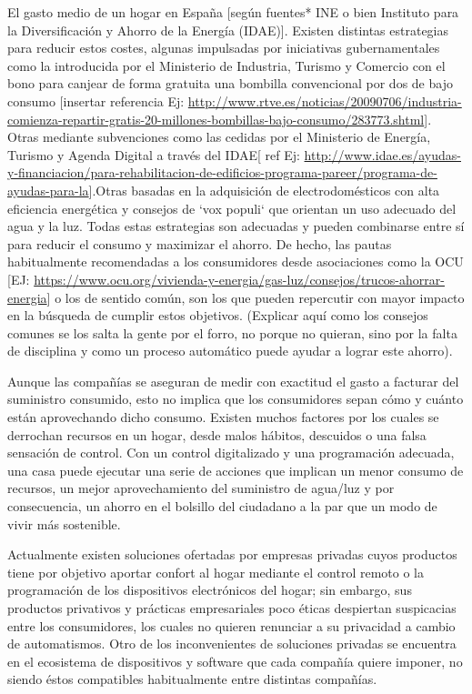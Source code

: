 El gasto medio de un hogar en España [según fuentes* INE o bien Instituto para la Diversificación y Ahorro de la Energía (IDAE)]. Existen distintas estrategias para reducir estos costes, algunas impulsadas por iniciativas gubernamentales como la introducida por el Ministerio de Industria, Turismo y Comercio con el bono para canjear de forma gratuita una bombilla convencional por dos de bajo consumo [insertar referencia Ej: \url{http://www.rtve.es/noticias/20090706/industria-comienza-repartir-gratis-20-millones-bombillas-bajo-consumo/283773.shtml}]. Otras mediante subvenciones como las cedidas por el Ministerio de Energía, Turismo y Agenda Digital a través del IDAE[ ref Ej: \url{http://www.idae.es/ayudas-y-financiacion/para-rehabilitacion-de-edificios-programa-pareer/programa-de-ayudas-para-la}].Otras basadas en la adquisición de electrodomésticos con alta eficiencia energética y consejos de `vox populi` que orientan un uso adecuado del agua y la luz. Todas estas estrategias son adecuadas y pueden combinarse entre sí para reducir el consumo y maximizar el ahorro. De hecho, las pautas habitualmente recomendadas a los consumidores desde asociaciones como la OCU [EJ: \url{https://www.ocu.org/vivienda-y-energia/gas-luz/consejos/trucos-ahorrar-energia}] o los de sentido común, son los que pueden repercutir con mayor impacto en la búsqueda de cumplir estos objetivos. (Explicar aquí como los consejos comunes se los salta la gente por el forro, no porque no quieran, sino por la falta de disciplina y como un proceso automático puede ayudar a lograr este ahorro).

Aunque las compañías se aseguran de medir con exactitud el gasto a facturar del suministro consumido, esto no implica que los consumidores sepan cómo y cuánto están aprovechando dicho consumo. Existen muchos factores por los cuales se derrochan recursos en un hogar, desde malos hábitos, descuidos o una falsa sensación de control. Con un control digitalizado y una programación adecuada, una casa puede ejecutar una serie de acciones que implican un menor consumo de recursos, un mejor aprovechamiento del suministro de agua/luz y por consecuencia, un ahorro en el bolsillo del ciudadano a la par que un modo de vivir más sostenible.

Actualmente existen soluciones ofertadas por empresas privadas cuyos productos tiene por objetivo aportar confort al hogar mediante el control remoto o la programación de los dispositivos electrónicos del hogar; sin embargo, sus productos privativos y prácticas empresariales poco éticas despiertan suspicacias entre los consumidores, los cuales no quieren renunciar a su privacidad a cambio de automatismos. Otro de los inconvenientes de soluciones privadas se encuentra en el ecosistema de dispositivos y software que cada compañía quiere imponer, no siendo éstos compatibles habitualmente entre distintas compañías.


